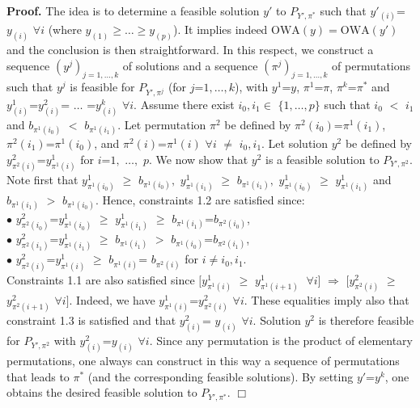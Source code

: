 \documentclass[final,3p,times]{elsarticle}
\newcommand{\owa}{\mbox{OWA}}
\newenvironment{pf}[1][]{{\noindent \bf Proof. #1 }}{\hfill $\Box$\\ }
\begin{document}
\begin{pf} The idea is to determine a feasible solution $y'$ to
  $P_{Y',\pi^*}$ such that $y'_{(i)}$=$y_{(i)}$ $\forall i$ (where $y_{(1)} \ge \ldots \ge y_{(p)}$). It
  implies indeed $\owa(y) = \owa(y')$ and the conclusion is then
  straightforward. In this respect, we construct a sequence
  $(y^j)_{j=1,\ldots,k}$ of solutions and a sequence
  $(\pi^j)_{j=1,\ldots,k}$ of permutations such that $y^j$ is feasible
  for $P_{Y',\pi^j}$ (for $j$=$1,\ldots,k$), with $y^1$=$y$,
  $\pi^1$=$\pi$, $\pi^k$=$\pi^*$ and $y^1_{(i)}$=$y^2_{(i)}$= $\ldots$
  =$y^k_{(i)}$ $\forall i$. Assume there exist $i_0,i_1\in$
  $\{1,\ldots,p\}$ such that $i_0$ $<$ $i_1$ and
  $b_{\pi^1(i_0)}$ $<$ $b_{\pi^1(i_1)}$. Let permutation $\pi^2$ be
  defined by $\pi^2(i_0)$=$\pi^1(i_1)$,
  $\pi^2(i_1)$=$\pi^1(i_0)$, and $\pi^2(i)$=$\pi^1(i)$ $\forall i$
  $\neq$ $i_0,i_1$. Let solution $y^2$ be defined by
  $y^2_{\pi^2(i)}$=$y^1_{\pi^1(i)}$ for $i$=$1,$ $\ldots,$ $p$. We now
  show that $y^2$ is a feasible solution to $P_{Y',\pi^2}$. Note first that
  $y^1_{\pi^1(i_0)}$ $\geq$ $b_{\pi^1(i_0)},$ $y^1_{\pi^1(i_1)}$
  $\geq$ $b_{\pi^1(i_1)},$ $y^1_{\pi^1(i_0)}$ $\geq$
  $y^1_{\pi^1(i_1)}$ and $b_{\pi^1(i_1)}$ $>$
  $b_{\pi^1(i_0)}$. Hence, constraints 1.2 are
  satisfied since:\\ $\bullet$ $y^2_{\pi^2(i_0)}$=$y^1_{\pi^1(i_0)}$ $\geq$
  $y^1_{\pi^1(i_1)}$ $\geq$
  $b_{\pi^1(i_1)}$=$b_{\pi^2(i_0)}$,\\ $\bullet$ $y^2_{\pi^2(i_1)}$=$y^1_{\pi^1(i_1)}$ $\geq$
  $b_{\pi^1(i_1)}$ $>$
  $b_{\pi^1(i_0)}$=$b_{\pi^2(i_1)}$,\\ $\bullet$ $y^2_{\pi^2(i)}$=$y^1_{\pi^1(i)}$ $\geq$
  $b_{\pi^1(i)}$= $b_{\pi^2(i)}$ for $i\neq
  i_0,i_1$.\\ Constraints 1.1 are also satisfied since $[y^1_{\pi^1(i)}$ $\ge$
  $y^1_{\pi^1(i+1)}\;$ $\forall i]$ $\Rightarrow$ $[y^2_{\pi^2(i)}$
  $\ge$ $y^2_{\pi^2(i+1)}$ $\forall i]$. Indeed, we have
  $y^1_{\pi^1(i)}$=$y^2_{\pi^2(i)}$ $\forall i$. These equalities
  imply also that constraint 1.3 is satisfied and that $y^2_{(i)}$=
  $y_{(i)}$ $\forall i$. Solution $y^2$ is therefore feasible for
  $P_{Y',\pi^2}$ with $y^2_{(i)}$=$y_{(i)}$ $\forall i$. Since any
  permutation is the product of elementary permutations, one
  always can construct in this way a sequence of permutations that
  leads to $\pi^*$ (and the corresponding feasible solutions). By
  setting $y'$=$y^k$, one obtains the desired feasible solution to
  $P_{Y',\pi^*}$. \end{pf} 
\end{document}
